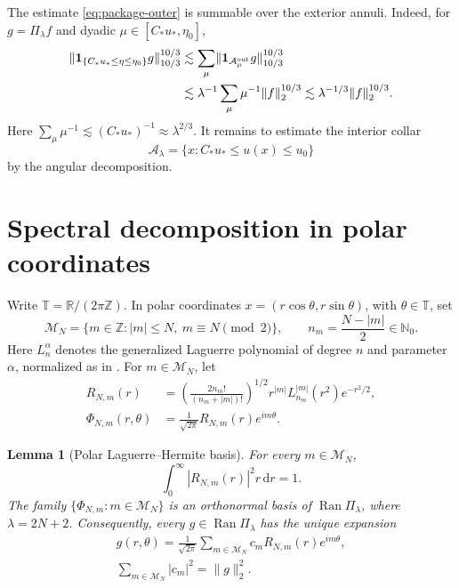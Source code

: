 \documentclass[11pt,a4paper]{amsart}
\newtheorem{lemma}[theorem]{Lemma}
\numberwithin{equation}{section}
\newcommand{\R}{\mathbb R}
\newcommand{\T}{\mathbb T}
\newcommand{\one}{\mathbf 1}
\newcommand{\dd}{\,\mathrm d}
\newcommand{\norm}[1]{\lVert #1\rVert}
\begin{document}
The estimate \eqref{eq:package-outer} is summable over the exterior annuli.
Indeed, for \(g=\Pi_\lambda f\) and dyadic
\(\mu\in[C_*u_*,\eta_0]\),
\begin{align}
 \norm{\one_{\{C_*u_*\le\eta\le\eta_0\}}g}_{10/3}^{10/3}
 &\lesssim\sum_\mu
 \norm{\one_{\mathcal A_\mu^{\rm out}}g}_{10/3}^{10/3}\notag\\
 &\lesssim\lambda^{-1}\sum_\mu\mu^{-1}\norm f_2^{10/3}
 \lesssim\lambda^{-1/3}\norm f_2^{10/3}.
 \label{eq:outer-sum}
\end{align}
Here
\(\sum_\mu\mu^{-1}\lesssim(C_*u_*)^{-1}\approx\lambda^{2/3}\).
It remains to estimate the interior collar
\[
 \mathcal A_\lambda=\{x:C_*u_*\le u(x)\le u_0\}
\]
by the angular decomposition.

\section{Spectral decomposition in polar coordinates}\label{sec:polar}

Write \(\T=\R/(2\pi\mathbb Z)\). In polar coordinates
\(x=(r\cos\theta,r\sin\theta)\), with \(\theta\in\T\), set
\[
 \mathcal M_N=\{m\in\mathbb Z:|m|\le N,\ m\equiv N\pmod2\},
 \qquad
 n_m=\frac{N-|m|}{2}\in\mathbb N_0.
\]
Here \(L_n^\alpha\) denotes the generalized Laguerre polynomial of degree \(n\)
and parameter \(\alpha\), normalized as in
\cite[(1.1.37)]{Thangavelu}. For \(m\in\mathcal M_N\), let
\begin{equation}\label{eq:radial-laguerre}
 \begin{split}
  R_{N,m}(r)&=
  \left(\frac{2n_m!}{(n_m+|m|)!}\right)^{1/2}
  r^{|m|}L_{n_m}^{|m|}(r^2)e^{-r^2/2},\\
  \Phi_{N,m}(r,\theta)&=\frac1{\sqrt{2\pi}}R_{N,m}(r)e^{im\theta}.
 \end{split}
\end{equation}

\begin{lemma}[Polar Laguerre--Hermite basis]\label{lem:polar-basis}
For every \(m\in\mathcal M_N\),
\[
 \int_0^\infty|R_{N,m}(r)|^2r\dd r=1.
\]
The family
\(\{\Phi_{N,m}:m\in\mathcal M_N\}\) is an orthonormal basis of
\(\operatorname{Ran}\Pi_\lambda\), where
\(\lambda=2N+2\). Consequently, every
\(g\in\operatorname{Ran}\Pi_\lambda\) has the unique expansion
\begin{equation}\label{eq:polar-expansion}
 \begin{gathered}
  g(r,\theta)=\frac1{\sqrt{2\pi}}
  \sum_{m\in\mathcal M_N}c_mR_{N,m}(r)e^{im\theta},\\
  \sum_{m\in\mathcal M_N}|c_m|^2=\norm g_2^2.
 \end{gathered}
\end{equation}
\end{lemma}
\end{document}
